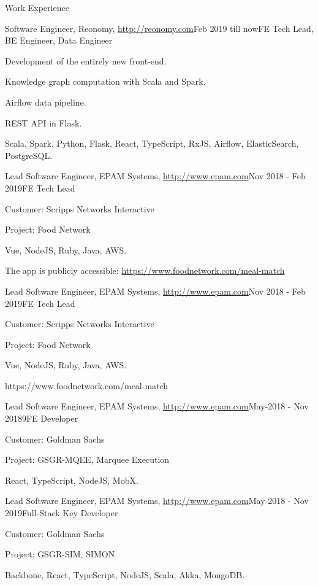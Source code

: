 \documentclass{resume}
\begin{document}
\begin{rSection}{Work Experience}

\begin{rSubsection}{Software Engineer, Reonomy, \url{http://reonomy.com}}{Feb 2019 till now}{FE Tech Lead, BE Engineer, Data Engineer}{}
\item Development of the entirely new front-end.
\item Knowledge graph computation with Scala and Spark.
\item Airflow data pipeline.
\item REST API in Flask.
\item Scala, Spark, Python, Flask, React, TypeScript, RxJS, Airflow, ElasticSearch, PostgreSQL.
\end{rSubsection}

\begin{rSubsection}{Lead Software Engineer, EPAM Systems, \url{http://www.epam.com}}{Nov 2018 - Feb 2019}{FE Tech Lead}{}
\item Customer: Scripps Networks Interactive
\item Project: Food Network
\item Vue, NodeJS, Ruby, Java, AWS.
\item The app is publicly accessible: \url{https://www.foodnetwork.com/meal-match}
\end{rSubsection}


\begin{rSubsection}{Lead Software Engineer, EPAM Systems, \url{http://www.epam.com}}{Nov 2018 - Feb 2019}{FE Tech Lead}{}
\item Customer: Scripps Networks Interactive
\item Project: Food Network
\item Vue, NodeJS, Ruby, Java, AWS.
\item https://www.foodnetwork.com/meal-match
\end{rSubsection}

\begin{rSubsection}{Lead Software Engineer, EPAM Systems, \url{http://www.epam.com}}{May-2018 - Nov 20189}{FE Developer}{}
\item Customer: Goldman Sachs
\item Project: GSGR-MQEE, Marquee Execution
\item React, TypeScript, NodeJS, MobX.
\end{rSubsection}


\begin{rSubsection}{Lead Software Engineer, EPAM Systems, \url{http://www.epam.com}}{May 2018 - Nov 2019}{Full-Stack Key Developer}{}
\item Customer: Goldman Sachs
\item Project: GSGR-SIM, SIMON
\item Backbone, React, TypeScript, NodeJS, Scala, Akka, MongoDB.
\end{rSubsection}



\end{rSection}
\end{document}
